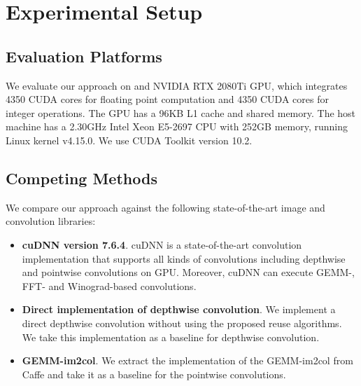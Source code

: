 

\section{Experimental Setup}

\subsection{Evaluation Platforms} We evaluate our approach on and NVIDIA RTX 2080Ti GPU, which integrates 4350 CUDA cores for floating
point computation  and 4350 CUDA cores for integer operations. The GPU has a 96KB L1 cache and shared memory. The host machine has a 2.30GHz
Intel Xeon E5-2697 CPU with 252GB memory, running Linux kernel v4.15.0. We use CUDA Toolkit version 10.2.


\subsection{Competing Methods} We compare our approach against the following state-of-the-art image and convolution libraries:
\begin{itemize}
  \item \textbf{cuDNN version 7.6.4}. cuDNN is a state-of-the-art convolution implementation that supports all kinds of convolutions including depthwise and pointwise convolutions on GPU. 
  Moreover, cuDNN can execute GEMM-, FFT- and Winograd-based convolutions.
  \item \textbf{Direct implementation of depthwise convolution}. We implement a direct depthwise convolution without using the proposed reuse algorithms. We take this implementation as a baseline for depthwise convolution.
  \item \textbf{GEMM-im2col}. We extract the implementation of the GEMM-im2col from Caffe \cite{jia2014caffe} and take it as a baseline
      for the pointwise convolutions.
\end{itemize}

